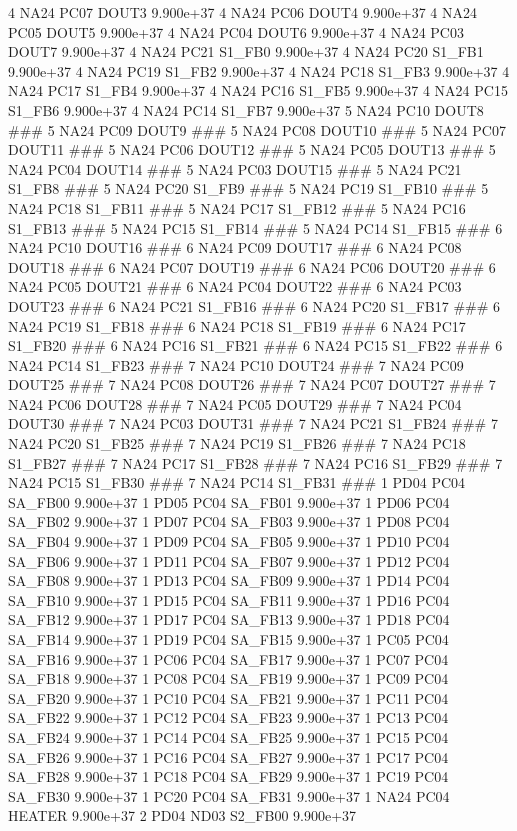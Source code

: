 4 NA24 PC07 DOUT3 9.900e+37 
4 NA24 PC06 DOUT4 9.900e+37 
4 NA24 PC05 DOUT5 9.900e+37 
4 NA24 PC04 DOUT6 9.900e+37 
4 NA24 PC03 DOUT7 9.900e+37 
4 NA24 PC21 S1_FB0 9.900e+37 
4 NA24 PC20 S1_FB1 9.900e+37 
4 NA24 PC19 S1_FB2 9.900e+37 
4 NA24 PC18 S1_FB3 9.900e+37 
4 NA24 PC17 S1_FB4 9.900e+37 
4 NA24 PC16 S1_FB5 9.900e+37 
4 NA24 PC15 S1_FB6 9.900e+37 
4 NA24 PC14 S1_FB7 9.900e+37 
5 NA24 PC10 DOUT8 ### 
5 NA24 PC09 DOUT9 ### 
5 NA24 PC08 DOUT10 ### 
5 NA24 PC07 DOUT11 ### 
5 NA24 PC06 DOUT12 ### 
5 NA24 PC05 DOUT13 ### 
5 NA24 PC04 DOUT14 ### 
5 NA24 PC03 DOUT15 ### 
5 NA24 PC21 S1_FB8 ### 
5 NA24 PC20 S1_FB9 ### 
5 NA24 PC19 S1_FB10 ### 
5 NA24 PC18 S1_FB11 ### 
5 NA24 PC17 S1_FB12 ### 
5 NA24 PC16 S1_FB13 ### 
5 NA24 PC15 S1_FB14 ### 
5 NA24 PC14 S1_FB15 ### 
6 NA24 PC10 DOUT16 ### 
6 NA24 PC09 DOUT17 ### 
6 NA24 PC08 DOUT18 ### 
6 NA24 PC07 DOUT19 ### 
6 NA24 PC06 DOUT20 ### 
6 NA24 PC05 DOUT21 ### 
6 NA24 PC04 DOUT22 ### 
6 NA24 PC03 DOUT23 ### 
6 NA24 PC21 S1_FB16 ### 
6 NA24 PC20 S1_FB17 ### 
6 NA24 PC19 S1_FB18 ### 
6 NA24 PC18 S1_FB19 ### 
6 NA24 PC17 S1_FB20 ### 
6 NA24 PC16 S1_FB21 ### 
6 NA24 PC15 S1_FB22 ### 
6 NA24 PC14 S1_FB23 ### 
7 NA24 PC10 DOUT24 ### 
7 NA24 PC09 DOUT25 ### 
7 NA24 PC08 DOUT26 ### 
7 NA24 PC07 DOUT27 ### 
7 NA24 PC06 DOUT28 ### 
7 NA24 PC05 DOUT29 ### 
7 NA24 PC04 DOUT30 ### 
7 NA24 PC03 DOUT31 ### 
7 NA24 PC21 S1_FB24 ### 
7 NA24 PC20 S1_FB25 ### 
7 NA24 PC19 S1_FB26 ### 
7 NA24 PC18 S1_FB27 ### 
7 NA24 PC17 S1_FB28 ### 
7 NA24 PC16 S1_FB29 ### 
7 NA24 PC15 S1_FB30 ### 
7 NA24 PC14 S1_FB31 ### 
1 PD04 PC04 SA_FB00 9.900e+37 
1 PD05 PC04 SA_FB01 9.900e+37 
1 PD06 PC04 SA_FB02 9.900e+37 
1 PD07 PC04 SA_FB03 9.900e+37 
1 PD08 PC04 SA_FB04 9.900e+37 
1 PD09 PC04 SA_FB05 9.900e+37 
1 PD10 PC04 SA_FB06 9.900e+37 
1 PD11 PC04 SA_FB07 9.900e+37 
1 PD12 PC04 SA_FB08 9.900e+37 
1 PD13 PC04 SA_FB09 9.900e+37 
1 PD14 PC04 SA_FB10 9.900e+37 
1 PD15 PC04 SA_FB11 9.900e+37 
1 PD16 PC04 SA_FB12 9.900e+37 
1 PD17 PC04 SA_FB13 9.900e+37 
1 PD18 PC04 SA_FB14 9.900e+37 
1 PD19 PC04 SA_FB15 9.900e+37 
1 PC05 PC04 SA_FB16 9.900e+37 
1 PC06 PC04 SA_FB17 9.900e+37 
1 PC07 PC04 SA_FB18 9.900e+37 
1 PC08 PC04 SA_FB19 9.900e+37 
1 PC09 PC04 SA_FB20 9.900e+37 
1 PC10 PC04 SA_FB21 9.900e+37 
1 PC11 PC04 SA_FB22 9.900e+37 
1 PC12 PC04 SA_FB23 9.900e+37 
1 PC13 PC04 SA_FB24 9.900e+37 
1 PC14 PC04 SA_FB25 9.900e+37 
1 PC15 PC04 SA_FB26 9.900e+37 
1 PC16 PC04 SA_FB27 9.900e+37 
1 PC17 PC04 SA_FB28 9.900e+37 
1 PC18 PC04 SA_FB29 9.900e+37 
1 PC19 PC04 SA_FB30 9.900e+37 
1 PC20 PC04 SA_FB31 9.900e+37 
1 NA24 PC04 HEATER 9.900e+37 
2 PD04 ND03 S2_FB00 9.900e+37 
